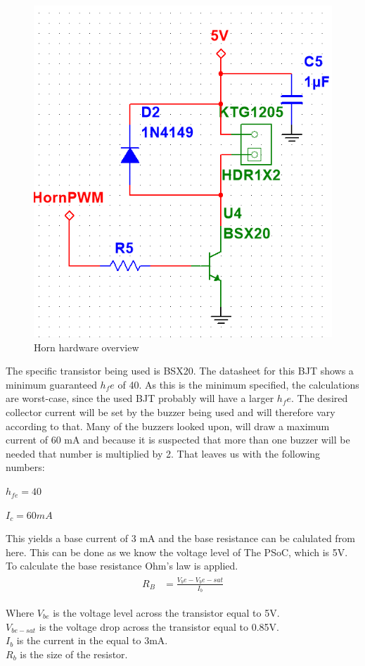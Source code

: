 \begin{figure}[H]
	\centering
	\includegraphics[width=0.5\linewidth]{Hardware/Pictures/Horn_hw}
	\caption{Horn hardware overview}
	\label{fig:Horn_control}
\end{figure}

The specific transistor being used is BSX20. The datasheet \cite{BSX20} for this BJT shows a minimum guaranteed $h_fe$ of 40. As this is the minimum specified, the calculations are worst-case, since the used BJT probably will have a larger $h_fe$. The desired collector current will be set by the buzzer being used and will therefore vary according to that. Many of the buzzers looked upon, will draw a maximum current of 60 mA and because it is suspected that more than one buzzer will be needed that number is multiplied by 2. That leaves us with the following numbers:

$h_{fe} = 40 $ 

$I_c = 60 mA$

This yields a base current of 3 mA and the base resistance can be calulated from here. This can be done as we know the voltage level of The PSoC, which is 5V. \\
To calculate the base resistance Ohm's law is applied. 
\begin{align}
	\begin{split}
		R_B &= \frac{V_be - V_be-sat}{I_b}
	\end{split}
\end{align}

Where $V_{be}$ is the voltage level across the transistor equal to 5V. \\ 
$V_{be-sat}$ is the voltage drop across the transistor equal to 0.85V. \\ 
$I_b$ is the current in the equal to 3mA.  \\
$R_b$ is the size of the resistor. 

